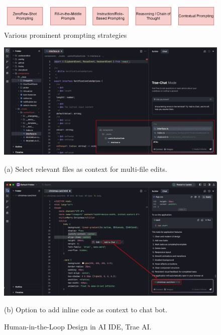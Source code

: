 \begin{figure}
    \centering
    \includegraphics[width=0.8\linewidth]{fig/prompt_strats.png}
    \caption{Various prominent prompting strategies}
    \label{fig:prompt}
\end{figure}

\begin{figure}[h]
    \centering
    \begin{minipage}[t]{0.8\textwidth}
        \centering
        \includegraphics[width=1\linewidth]{fig/trae-1.png} %
        \caption*{(a) Select relevant files as context for multi-file edits.} %
        \vspace{0.5cm}
    \end{minipage}
    \begin{minipage}[t]{0.8\textwidth}
        \centering
        \includegraphics[width=1\linewidth]{fig/trae-2.png} %
        \caption*{(b) Option to add inline code as context to chat bot.} %
    \end{minipage}
    \caption{Human-in-the-Loop Design in AI IDE, Trae AI.}
    \label{fig:trae}
\end{figure}

